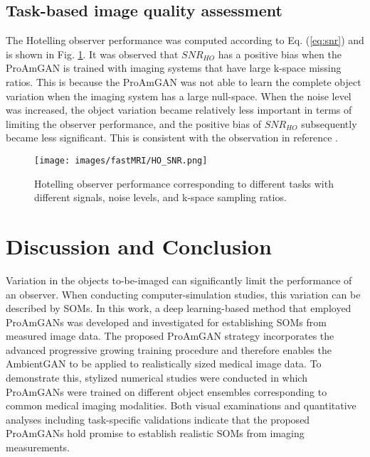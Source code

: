 \documentclass[journal]{IEEEtran}
\begin{document}
\subsection{Task-based image quality assessment} 
The Hotelling observer performance was computed according to Eq. (\ref{eq:snr}) and is shown in Fig. \ref{fig:HOs}. It was observed that $SNR_{HO}$ has a positive bias when the ProAmGAN is trained with imaging systems that have large k-space missing ratios. This is because the ProAmGAN was not able to learn the complete object variation when the imaging system has a large null-space. 
When the noise level was increased, the object variation became relatively less important in terms of limiting the observer performance, and the positive bias of $SNR_{HO}$ subsequently became less significant.
This is consistent with the observation in reference \cite{kupinski2007bias}.
 \vspace{-0.3cm}
\begin{figure}[H]
   \centering
 \texttt{[image: images/fastMRI/HO\_SNR.png]}
 \vspace{-0.5cm}
 \caption{Hotelling observer performance corresponding to different tasks with  different signals, noise levels, and k-space sampling ratios.}
 \label{fig:HOs}
\end{figure}


\section{Discussion and Conclusion}
\label{sec:conclusion}
Variation in  the objects to-be-imaged can significantly limit
the performance of an observer.
When conducting computer-simulation studies, this variation can be described by SOMs.
In this work,
a deep learning-based method that employed ProAmGANs was developed and investigated for establishing SOMs from measured image data.
The proposed ProAmGAN strategy incorporates the advanced progressive growing training procedure 
and therefore enables the AmbientGAN to be applied to realistically sized medical image data.
To demonstrate this, 
stylized numerical studies were conducted in which ProAmGANs were trained on different object ensembles corresponding to common medical imaging modalities.
Both visual examinations and quantitative analyses including task-specific validations indicate that the proposed ProAmGANs 
hold promise to establish realistic SOMs from imaging measurements.
\end{document}

